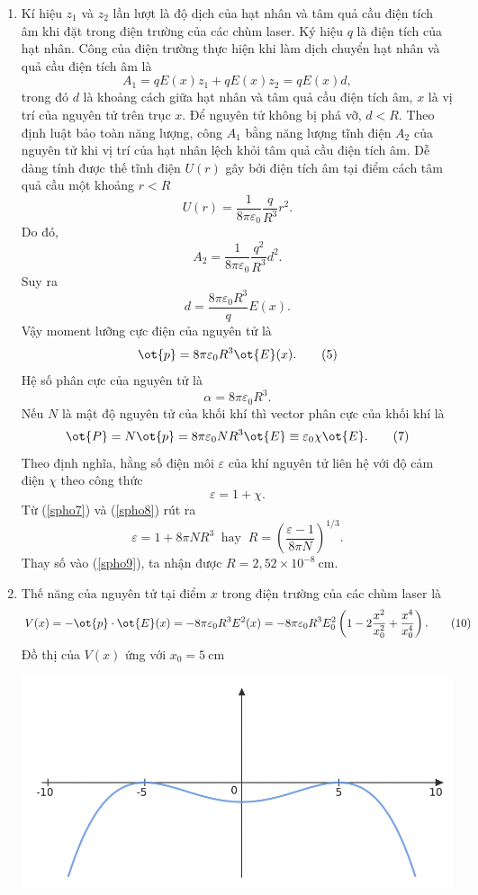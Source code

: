 \begin{loigiai}
\begin{enumerate}[1)]
    \item Kí hiệu $z_{1}$ và $z_{2}$ lần lượt là độ dịch của hạt nhân và tâm quả cầu điện tích âm khi đặt trong điện trường của các chùm laser. Ký hiệu $q$ là điện tích của hạt nhân. Công của điện trường thực hiện khi làm dịch chuyển hạt nhân và quả cầu điện tích âm là
\[
A_{1}=q E(x) z_{1}+q E(x) z_{2}=q E(x) d, \tag{1}
\]
trong đó $d$ là khoảng cách giữa hạt nhân và tâm quả cầu điện tích âm, $x$ là vị trí của nguyên tử trên trục $x$. Để nguyên tử không bị phá vỡ, $d<R$. Theo định luật bảo toàn năng lượng, công $A_{1}$ bằng năng lượng tĩnh điện $A_{2}$ của nguyên tử khi vị trí của hạt nhân lệch khỏi tâm quả cầu điện tích âm. Dễ dàng tính được thế tĩnh điện $U(r)$ gây bởi điện tích âm tại điểm cách tâm quả cầu một khoảng $r<R$
\[U(r)=\dfrac{1}{8 \pi \varepsilon_{0}} \dfrac{q}{R^{3}} r^{2}. \tag{2}\]
Do đó,
\[
A_{2}=\dfrac{1}{8 \pi \varepsilon_{0}} \dfrac{q^{2}}{R^{3}} d^{2}. \tag{3}
\]
Suy ra
\[
d=\dfrac{8 \pi \varepsilon_{0} R^{3}}{q} E(x). \tag{4}
\]
Vậy moment lưỡng cực điện của nguyên tử là
\[
\ot{p}=8 \pi \varepsilon_{0} R^{3} \ot{E}(x). \tag{5}
\]
Hệ số phân cực của nguyên tử là
\[
\alpha=8 \pi \varepsilon_{0} R^{3}. \tag{6}
\]
Nếu $N$ là mật độ nguyên tử của khối khí thì vector phân cực của khối khí là
\[
\ot{P}=N \ot{p}=8 \pi \varepsilon_{0} N R^{3} \ot{E} \equiv \varepsilon_{0} \chi \ot{E}. \tag{7} \label{spho7}
\]
Theo định nghĩa, hằng số điện môi $\varepsilon$ của khí nguyên tử liên hệ với độ cảm điện $\chi$ theo công thức
\[
\varepsilon=1+\chi. \tag{8} \label{spho8}
\]
Từ (\ref{spho7}) và (\ref{spho8}) rút ra
\[
\varepsilon = 1+8 \pi N R^{3} \ \text { hay } \ R = \left(\dfrac{\varepsilon-1}{8 \pi N}\right)^{1/3}. \tag{9} \label{spho9}
\]
Thay số vào (\ref{spho9}), ta nhận được $R = 2,52 \times 10^{-8} ~\mathrm{cm}$.
\item Thế năng của nguyên tử tại điểm $x$ trong điện trường của các chùm laser là
\[
V(x)=-\ot{p} \cdot \ot{E}(x)=-8 \pi \varepsilon_{0} R^{3} E^{2}(x)=-8 \pi \varepsilon_{0} R^{3} E_{0}^{2}\left(1-2 \dfrac{x^{2}}{x_{0}^{2}}+\dfrac{x^{4}}{x_{0}^{4}}\right). \tag{10}
\]
Đồ thị của $V(x)$ ứng với $x_0=5~\mathrm{cm}$
\begin{center}
\includegraphics[scale=0.6]{Anh/Screen Shot 2021-09-05 at 00.21.27.png}

\end{center}
\end{enumerate}
\end{loigiai}
